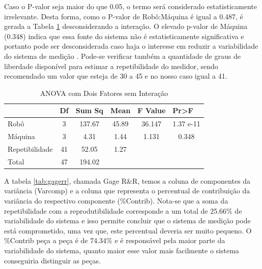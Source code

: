 \documentclass[
12pt,					%
openright,				%
oneside,				%
a4paper,				%
english,
brazil
]{ABNT/abntex2_report}
\begin{document}
Caso o P-valor seja maior do que 0.05, o termo será considerado estatisticamente irrelevante. Desta forma, como o P-valor de Robô:Máquina é igual a 0.487, é gerada a Tabela \ref{tab:no_interaction} desconsiderando a interação. O elevado p-valor de Máquina (0.348) indica que essa fonte do sistema não é estatisticamente significativa e portanto pode ser desconsiderada caso haja o interesse em reduzir a variabilidade do sistema de medição \cite{estudo_rr}. Pode-se verificar também a quantidade de graus de liberdade disponível para estimar a repetibilidade do medidor, sendo recomendado um valor que esteja de 30 a 45 e no nosso caso igual a 41.
\begin{table}[H]
	\centering
	\caption{ANOVA com Dois Fatores sem Interação}
	\begin{tabular}{lccccc}
										& \multicolumn{1}{l}{Df} & \multicolumn{1}{l}{Sum Sq} & \multicolumn{1}{l}{Mean} & \multicolumn{1}{l}{F Value} & \multicolumn{1}{l}{Pr\textgreater{}F} \\ \hline
	\multicolumn{1}{l|}{Robô}           & 3                      & 137.67                     & 45.89                    & 36.147                      & 1.37 e-11                             \\
	\multicolumn{1}{l|}{Máquina}        & 3                      & 4.31                       & 1.44                     & 1.131                       & 0.348                                 \\
	\multicolumn{1}{l|}{Repetibilidade} & 41                     & 52.05                      & 1.27                     &                             &                                       \\
	\multicolumn{1}{l|}{Total}          & 47                     & 194.02                     &                          &                             &                                      
	\end{tabular}
	\label{tab:no_interaction}
\end{table}

A tabela \ref{tab:gagerr}, chamada Gage R\&R, temos a coluna de componentes da variância (Varcomp) e a coluna que representa o percentual de contribuição da variância do respectivo componente (\%Contrib). Nota-se que a soma da repetibilidade com a reprodutibilidade corresponde a um total de 25.66\% de variabilidade do sistema e isso  permite concluir que o sistema de medição pode está comprometido, uma vez que, este percentual deveria ser muito pequeno. O \%Contrib peça a peça é de 74.34\% e é responsável pela maior parte da variabilidade do sistema,  quanto maior esse valor mais facilmente  o sistema conseguiria distinguir as peças.
\end{document}
